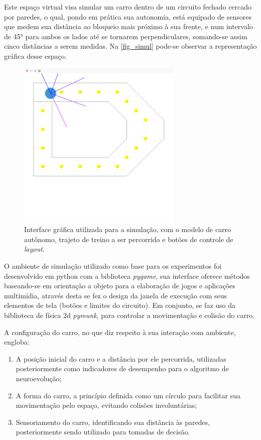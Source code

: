 Este espaço virtual visa simular um carro dentro de um
circuito fechado cercado por paredes, o qual, pondo em prática
sua autonomia, está equipado de sensores que medem sua
distância ao bloqueio mais próximo à sua frente, e num
intervalo de 45° para ambos os lados até se tornarem
perpendiculares, somando-se assim cinco distâncias a serem
medidas. Na \autoref{fig_simul} pode-se observar a representa{\c c}{\~a}o gr{\'a}fica desse espa{\c c}o.

\begin{figure}[htb]
        \centering
        \caption{\label{fig_simul}Interface gráfica utilizada para a simulação, com o modelo de carro autônomo, trajeto de treino a ser percorrido e botões de controle de \textit{layout}.}
        \includegraphics[width=0.7\textwidth]{images/simul.png}
\end{figure}

O ambiente de simulação utilizado como base para os
experimentos foi desenvolvido em python com a biblioteca
\textit{pygame}, sua interface oferece métodos baseando-se em
orientação a objeto para a elaboração de jogos e aplicações
multimídia, através desta se fez o design da janela de
execução com seus elementos de tela (botões e limites do
circuito). Em conjunto, se faz uso da biblioteca de física 2d
\textit{pymunk}, para controlar a movimentação e colisão do carro.

A configuração do carro, no que diz respeito à sua interação
com ambiente, engloba:

\begin{enumerate}
	\item A posição inicial do carro e a distância por ele percorrida, utilizadas posteriormente como indicadores de desempenho para o algoritmo de neuroevolução;
	\item A forma do carro, a princípio definida como um círculo para facilitar sua movimentação pelo espaço, evitando colisões involuntárias;
	\item Sensoriamento do carro, identificando sua distância às paredes, posteriormente sendo utilizado para tomadas de decisão.
\end{enumerate}


